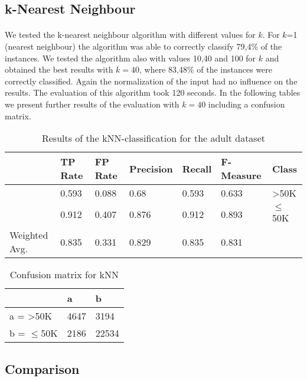\documentclass[paper=a4, fontsize=11pt]{scrartcl} %
\numberwithin{equation}{section} %
\numberwithin{figure}{section} %
\numberwithin{table}{section} %
\begin{document}
\subsection{k-Nearest Neighbour}

\paragraph{}We tested the k-nearest neighbour algorithm with different values for $k$. For $k$=1 (nearest neighbour) the algorithm was able to correctly classify 79,4\% of the instances. We tested the algorithm also with values 10,40 and 100 for $k$ and obtained the best results with $k=40$, where 83,48\% of the instances were correctly classified. Again the normalization of the input had no influence on the results. The evaluation of this algorithm took 120 seconds. In the following tables we present further results of the evaluation with $k=40$ including a confusion matrix.

\begin{table}[h]
\centering
\begin{tabular}{lllllll}
	\toprule
									&TP Rate   &FP Rate   &Precision   &Recall  &F-Measure &Class\\
	\midrule
									&0.593     &0.088      &0.68      &0.593     &0.633    &>50K\\
									&0.912     &0.407      &0.876     &0.912     &0.893    &$\leq$50K\\
  
	Weighted Avg.   &0.835     &0.331      &0.829     &0.835     &0.831     \\
	\bottomrule
\end{tabular}
\caption{Results of the kNN-classification for the adult dataset}
\end{table}

\vspace{6pt}

\begin{table}[h]
\centering
\begin{tabular}{|l|ll|}
	\hline
	 &              a    & b     \\
	\hline
    a = >50K      &	4647 & 3194  \\
    b = $\leq$50K & 2186 & 22534 \\
    \hline
\end{tabular}
\caption{Confusion matrix for kNN}
\end{table}


\subsection{Comparison}
\end{document}
